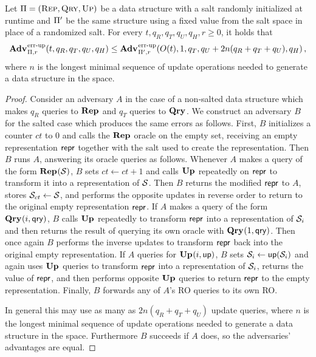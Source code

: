 \begin{lemma}\label{lemma:noinvsalt}
  Let $\mathrm{\Pi} = (\textsc{Rep}, \textsc{Qry}, \textsc{Up})$ be a data structure with a salt randomly initialized at runtime and $\mathrm{\Pi}'$ be the same structure using a fixed value from the salt space in place of a randomized salt. For every $t, q_R, q_T, q_U, q_H, r\geq 0$, it holds that
  \[
    \Adv{\errep}_{\struct,r}(t, q_R, q_T, q_U, q_H) \leq
    \Adv{\errep}_{\struct',r}(O(t), 1, q_T, q_U+2n(q_R+q_T+q_U), q_H) \,,
  \]
  where $n$ is the longest minimal sequence of update operations needed to generate a data structure in the space.
\end{lemma}
\begin{proof}
Consider an adversary $A$ in the case of a non-salted data structure which makes $q_R$ queries to $\mathbf{Rep}\hspace{0.5pt}$ and $q_T$ queries to $\mathbf{Qry}\hspace{0.5pt}$. We construct an adversary $B$ for the salted case which produces the same errors as follows. First, $B$ initializes a counter $ct$ to 0 and calls the $\mathbf{Rep}\hspace{0.5pt}$ oracle on the empty set, receiving an empty representation $\mathsf{repr}$ together with the salt used to create the representation. Then $B$ runs $A$, answering its oracle queries as follows. Whenever $A$ makes a query of the form $\mathbf{Rep}\hspace{0.5pt}(\mathcal{S})$, $B$ sets $ct \gets ct + 1$ and calls $\mathbf{Up}\hspace{0.5pt}$ repeatedly on $\mathsf{repr}$ to transform it into a representation of $\mathcal{S}$. Then $B$ returns the modified $\mathsf{repr}$ to $A$, stores $\mathcal{S}_{ct} \gets \mathcal{S}$, and performs the opposite updates in reverse order to return to the original empty representation $\mathsf{repr}$. If $A$ makes a query of the form $\mathbf{Qry}\hspace{0.5pt}(i,\mathsf{qry})$, $B$ calls $\mathbf{Up}\hspace{0.5pt}$ repeatedly to transform $\mathsf{repr}$ into a representation of $\mathcal{S}_i$ and then returns the result of querying its own oracle with $\mathbf{Qry}\hspace{0.5pt}(1, \mathsf{qry})$. Then once again $B$ performs the inverse updates to transform $\mathsf{repr}$ back into the original empty representation. If $A$ queries for $\mathbf{Up}\hspace{0.5pt}(i, \mathsf{up})$, $B$ sets $\mathcal{S}_i \gets \mathsf{up}(\mathcal{S}_i)$ and again uses $\mathbf{Up}\hspace{0.5pt}$ queries to transform $\mathsf{repr}$ into a representation of $\mathcal{S}_i$, returns the value of $\mathsf{repr}$, and then performs opposite $\mathbf{Up}\hspace{0.5pt}$ queries to return $\mathsf{repr}$ to the empty representation. Finally, $B$ forwards any of $A$'s RO queries to its own RO.

In general this may use as many as $2n(q_R+q_T+q_U)$ update queries, where $n$ is the longest minimal sequence of update operations needed to generate a data structure in the space. Furthermore $B$ succeeds if $A$ does, so the adversaries' advantages are equal.\missingqed
\end{proof}

